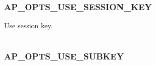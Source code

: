 \documentclass[letterpaper,10pt,english]{sphinxmanual}
\begin{document}
\begin{fulllineitems}
\label{appdev/refs/macros/AP_OPTS_RESERVED:AP_OPTS_RESERVED}
\end{fulllineitems}


\begin{tabulary}{\linewidth}{|L|L|}
\hline

 & 
\\\hline
\end{tabulary}



\subsubsection{AP\_OPTS\_USE\_SESSION\_KEY}
\label{appdev/refs/macros/AP_OPTS_USE_SESSION_KEY:ap-opts-use-session-key}\label{appdev/refs/macros/AP_OPTS_USE_SESSION_KEY::doc}\label{appdev/refs/macros/AP_OPTS_USE_SESSION_KEY:ap-opts-use-session-key-data}

\begin{fulllineitems}
\label{appdev/refs/macros/AP_OPTS_USE_SESSION_KEY:AP_OPTS_USE_SESSION_KEY}
\end{fulllineitems}


Use session key.

\begin{tabulary}{\linewidth}{|L|L|}
\hline

 & 
\\\hline
\end{tabulary}



\subsubsection{AP\_OPTS\_USE\_SUBKEY}
\label{appdev/refs/macros/AP_OPTS_USE_SUBKEY:ap-opts-use-subkey}\label{appdev/refs/macros/AP_OPTS_USE_SUBKEY:ap-opts-use-subkey-data}\label{appdev/refs/macros/AP_OPTS_USE_SUBKEY::doc}

\begin{fulllineitems}
\label{appdev/refs/macros/AP_OPTS_USE_SUBKEY:AP_OPTS_USE_SUBKEY}
\end{fulllineitems}
\end{document}
